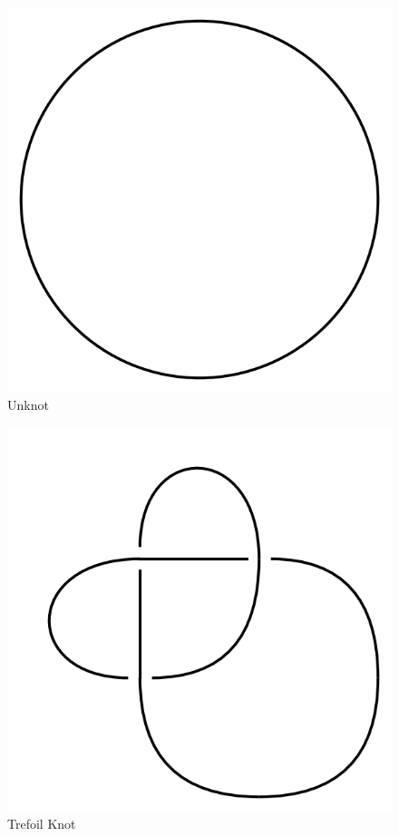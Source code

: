 \documentclass[12pt]{amsart}
\theoremstyle{definition}
\theoremstyle{remark}
\numberwithin{equation}{section}
\newcommand{\ds}{.3}
\begin{document}
\begin{figure}
  \includegraphics[scale=\ds]{unknot}
  \caption{Unknot}
  \label{fig:unknot}
\end{figure}

\begin{figure}
  \includegraphics[scale=\ds]{trefoil}
  \caption{Trefoil Knot}
  \label{fig:trefoil}
\end{figure}
\end{document}
